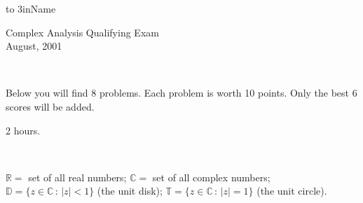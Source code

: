 \documentclass[12pt]{article}
\begin{document}
\vspace*{-1in}
\hfill\hbox to 3in{Name \hrulefill}
\vspace{1in}
\begin{center}{\large Complex Analysis Qualifying Exam}
\\\bigskip
{\large August, 2001}
\end{center}

\

  Below you will find 8 problems.
Each problem is worth 10 points. Only the
best 6 scores will be added.

 2 hours.

\

 $\mathbb{R}=$ set of all real numbers;
$\mathbb{C}=$ set of all complex numbers; $\mathbb{D}=\{z\in\mathbb{C}\,:\,|z|<1\}$ (the unit disk); $\mathbb{T}=\{z\in\mathbb{C}\,:\,|z|=1\}$ (the unit circle).

\
\end{document}
